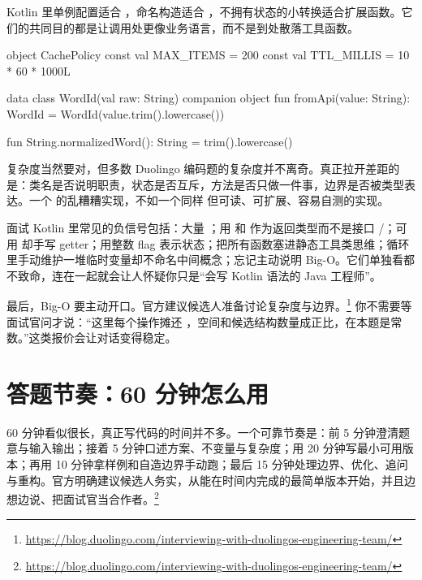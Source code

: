 Kotlin 里单例配置适合 ，命名构造适合 ，不拥有状态的小转换适合扩展函数。它们的共同目的都是让调用处更像业务语言，而不是到处散落工具函数。

\begin{kotlin}
object CachePolicy {
    const val MAX_ITEMS = 200
    const val TTL_MILLIS = 10 * 60 * 1000L
}

data class WordId(val raw: String) {
    companion object {
        fun fromApi(value: String): WordId = WordId(value.trim().lowercase())
    }
}

fun String.normalizedWord(): String = trim().lowercase()
\end{kotlin}

\begin{idea}
复杂度当然要对，但多数 Duolingo 编码题的复杂度并不离奇。真正拉开差距的是：类名是否说明职责，状态是否互斥，方法是否只做一件事，边界是否被类型表达。一个  的乱糟糟实现，不如一个同样  但可读、可扩展、容易自测的实现。
\end{idea}

\begin{pitfall}
面试 Kotlin 里常见的负信号包括：大量 \code{!!}；用  和  作为返回类型而不是接口 /；可用  却手写 getter；用整数 flag 表示状态；把所有函数塞进静态工具类思维；循环里手动维护一堆临时变量却不命名中间概念；忘记主动说明 Big-O。它们单独看都不致命，连在一起就会让人怀疑你只是“会写 Kotlin 语法的 Java 工程师”。
\end{pitfall}

最后，Big-O 要主动开口。官方建议候选人准备讨论复杂度与边界。\srcofficial\footnote{\url{https://blog.duolingo.com/interviewing-with-duolingos-engineering-team/}} 你不需要等面试官问才说：“这里每个操作摊还 ，空间和候选结构数量成正比，在本题是常数。”这类报价会让对话变得稳定。

\section{答题节奏：60 分钟怎么用}

60 分钟看似很长，真正写代码的时间并不多。一个可靠节奏是：前 5 分钟澄清题意与输入输出；接着 5 分钟口述方案、不变量与复杂度；用 20 分钟写最小可用版本；再用 10 分钟拿样例和自造边界手动跑；最后 15 分钟处理边界、优化、追问与重构。官方明确建议候选人务实，从能在时间内完成的最简单版本开始，并且边想边说、把面试官当合作者。\srcofficial\footnote{\url{https://blog.duolingo.com/interviewing-with-duolingos-engineering-team/}}

